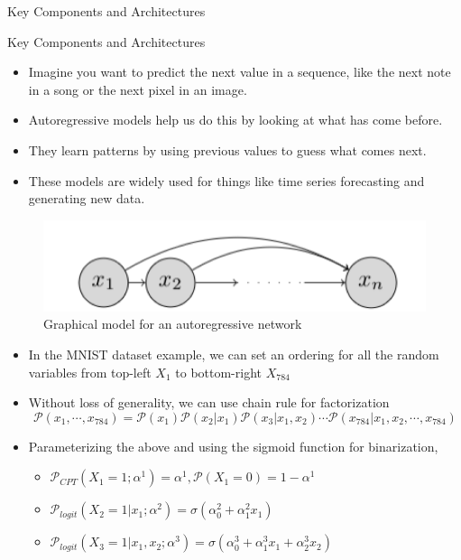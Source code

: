 \begin{frame}[allowframebreaks]{}
    \centering
    \LARGE Key Components and Architectures
\end{frame}

\begin{frame}[allowframebreaks]{Key Components and Architectures}
    \begin{itemize}
        \item Imagine you want to predict the next value in a sequence, like the next note in a song or the next pixel in an image.
        \item Autoregressive models help us do this by looking at what has come before.
        \item They learn patterns by using previous values to guess what comes next.
        \item These models are widely used for things like time series forecasting and generating new data.
    \end{itemize}

    \begin{figure}
    \centering
    \includegraphics[height=0.5\textheight, width=\textwidth, keepaspectratio]{images/autoregressive/autoregressive.png}
    \caption*{Graphical model for an autoregressive network}
\end{figure}

\framebreak

\begin{itemize}
    \item In the MNIST dataset example, we can set an ordering for all the random variables from top-left $X_1$ to bottom-right $X_{784}$
    \item Without loss of generality, we can use chain rule for factorization
    $$\mathcal{P}(x_1, \cdots, x_{784}) = \mathcal{P}(x_1) \mathcal{P}(x_2|x_1) \mathcal{P}(x_3|x_1, x_2) \cdots \mathcal{P}(x_{784}|x_1, x_2, \cdots, x_{784})$$
    \item Parameterizing the above and using the sigmoid function for binarization,
    \begin{itemize}
        \item $\mathcal{P}_{CPT}(X_1=1;\alpha^1) = \alpha^1, \mathcal{P}(X_1=0) = 1-\alpha^1$
        \item $\mathcal{P}_{logit}(X_2=1|x_1;\alpha^2) = \sigma (\alpha_0^2 + \alpha_1^2 x_1)$
        \item $\mathcal{P}_{logit}(X_3=1|x_1,x_2;\alpha^3) = \sigma (\alpha_0^3 + \alpha_1^3 x_1 + \alpha_2^3 x_2)$
    \end{itemize}
\end{itemize}
\end{frame}
